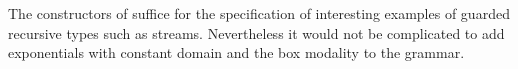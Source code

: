 The constructors of   suffice for the specification of interesting examples of guarded recursive types such as streams. Nevertheless it would not be complicated to add exponentials with
constant domain and the box modality to the grammar.


